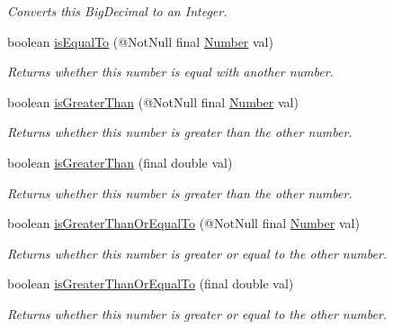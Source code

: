 \begin{DoxyCompactItemize}
\begin{DoxyCompactList}\small\item\em Converts this Big\+Decimal to an Integer. \end{DoxyCompactList}\item 
boolean \hyperlink{interfacecom_1_1aarrelaakso_1_1drawl_1_1_number_aa8ef6fc2e77da054f3a42f2cd81ec8a6}{is\+Equal\+To} (@Not\+Null final \hyperlink{interfacecom_1_1aarrelaakso_1_1drawl_1_1_number}{Number} val)
\begin{DoxyCompactList}\small\item\em Returns whether this number is equal with another number. \end{DoxyCompactList}\item 
boolean \hyperlink{interfacecom_1_1aarrelaakso_1_1drawl_1_1_number_a487be710eb911b7f3395014ee8cd4155}{is\+Greater\+Than} (@Not\+Null final \hyperlink{interfacecom_1_1aarrelaakso_1_1drawl_1_1_number}{Number} val)
\begin{DoxyCompactList}\small\item\em Returns whether this number is greater than the other number. \end{DoxyCompactList}\item 
boolean \hyperlink{interfacecom_1_1aarrelaakso_1_1drawl_1_1_number_ab3c02c742e083e6850ee6d2fe88e985b}{is\+Greater\+Than} (final double val)
\begin{DoxyCompactList}\small\item\em Returns whether this number is greater than the other number. \end{DoxyCompactList}\item 
boolean \hyperlink{interfacecom_1_1aarrelaakso_1_1drawl_1_1_number_a9c3df12a860251807827d670994b89a4}{is\+Greater\+Than\+Or\+Equal\+To} (@Not\+Null final \hyperlink{interfacecom_1_1aarrelaakso_1_1drawl_1_1_number}{Number} val)
\begin{DoxyCompactList}\small\item\em Returns whether this number is greater or equal to the other number. \end{DoxyCompactList}\item 
boolean \hyperlink{interfacecom_1_1aarrelaakso_1_1drawl_1_1_number_ae41d4d8a98ecc4a8e9e3be80d1a6b291}{is\+Greater\+Than\+Or\+Equal\+To} (final double val)
\begin{DoxyCompactList}\small\item\em Returns whether this number is greater or equal to the other number. \end{DoxyCompactList}\item 

\end{DoxyCompactItemize}
